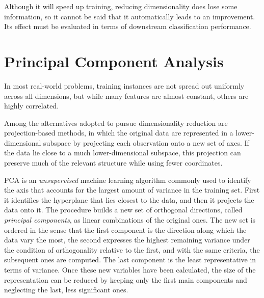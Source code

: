 Although it will speed up training, reducing dimensionality does lose some information, so it cannot be said that it automatically leads to an improvement. Its effect must be evaluated in terms of downstream classification performance.


\section{Principal Component Analysis}
\label{sec:pca_theory}

In most real-world problems, training instances are not spread out uniformly across
all dimensions, but while many features are almost constant, others are highly correlated.

Among the alternatives adopted to pursue dimensionality reduction are projection-based methods, in which the original data are represented in a lower-dimensional subspace by projecting each observation onto a new set of axes. If the data lie close to a much lower-dimensional subspace, this projection can preserve much of the relevant structure while using fewer coordinates. 

PCA is an \textit{unsupervised} machine learning algorithm commonly used to identify the axis that accounts for the largest amount of variance in the training set. First it identifies the hyperplane that lies closest to the data, and then
it projects the data onto it. 
The procedure builds a new set of orthogonal directions, called \textit{principal components}, as linear combinations of the original ones. The new set is ordered in the sense that the first component is the direction along which the data vary the most, the second expresses the highest  remaining variance under the condition of orthogonality relative to the first, and with the same criteria, the subsequent ones are computed. The last component is the least representative in terms of variance. Once these new variables have been calculated, the size of the representation can be reduced by keeping only the first main components and neglecting the last, less significant ones.


